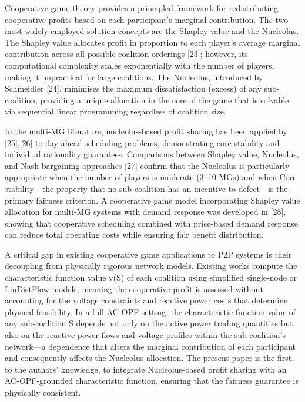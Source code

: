 \documentclass[preprint,12pt]{elsarticle}
\begin{document}
Cooperative game theory provides a principled framework for redistributing cooperative profits based on each participant's marginal contribution. The two most widely employed solution concepts are the Shapley value and the Nucleolus. The Shapley value allocates profit in proportion to each player's average marginal contribution across all possible coalition orderings [23]; however, its computational complexity scales exponentially with the number of players, making it impractical for large coalitions. The Nucleolus, introduced by Schmeidler [24], minimises the maximum dissatisfaction (excess) of any sub-coalition, providing a unique allocation in the core of the game that is solvable via sequential linear programming regardless of coalition size.

In the multi-MG literature, nucleolus-based profit sharing has been applied by [25],[26] to day-ahead scheduling problems, demonstrating core stability and individual rationality guarantees. Comparisons between Shapley value, Nucleolus, and Nash bargaining approaches [27] confirm that the Nucleolus is particularly appropriate when the number of players is moderate (3–10 MGs) and when Core stability—the property that no sub-coalition has an incentive to defect—is the primary fairness criterion. A cooperative game model incorporating Shapley value allocation for multi-MG systems with demand response was developed in [28], showing that cooperative scheduling combined with price-based demand response can reduce total operating costs while ensuring fair benefit distribution.

A critical gap in existing cooperative game applications to P2P systems is their decoupling from physically rigorous network models. Existing works compute the characteristic function value v(S) of each coalition using simplified single-node or LinDistFlow models, meaning the cooperative profit is assessed without accounting for the voltage constraints and reactive power costs that determine physical feasibility. In a full AC-OPF setting, the characteristic function value of any sub-coalition S depends not only on the active power trading quantities but also on the reactive power flows and voltage profiles within the sub-coalition's network—a dependence that alters the marginal contribution of each participant and consequently affects the Nucleolus allocation. The present paper is the first, to the authors' knowledge, to integrate Nucleolus-based profit sharing with an AC-OPF-grounded characteristic function, ensuring that the fairness guarantee is physically consistent.
\end{document}
